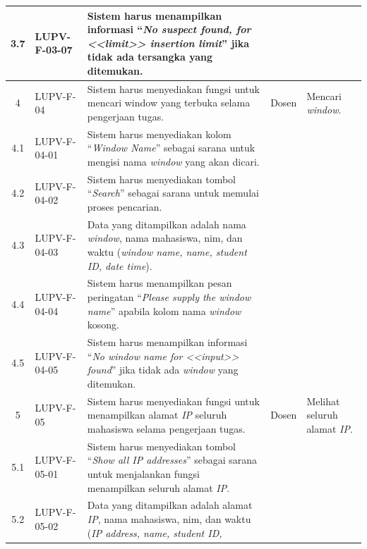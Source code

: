 {\begin{longtable}{|c|L{2.5cm}|L{5cm}|L{1.8cm}|L{2.1cm}|}
    3.7 & LUPV-F-03-07 & Sistem harus menampilkan informasi ``\emph{No
                         suspect found, for <<limit>> insertion limit}'' jika tidak ada tersangka
                         yang ditemukan. & &\\\hline
    4 & LUPV-F-04 & Sistem harus menyediakan fungsi untuk mencari
                    window yang terbuka selama pengerjaan
                    tugas. & Dosen & Mencari \emph{window}. \\
    4.1 & LUPV-F-04-01 & Sistem harus menyediakan kolom ``\emph{Window
                         Name}'' sebagai sarana untuk mengisi nama
                         \emph{window} yang akan dicari.  &  &\\
    4.2 & LUPV-F-04-02 & Sistem harus menyediakan tombol
                         ``\emph{Search}'' sebagai sarana untuk
                         memulai proses pencarian. & &\\
    4.3 & LUPV-F-04-03 & Data yang ditampilkan adalah nama
                         \emph{window}, nama mahasiswa, nim, dan waktu
                         (\emph{window name, name,  student ID,
                         date time}). & &\\
    4.4 & LUPV-F-04-04 & Sistem harus menampilkan pesan peringatan ``\emph{Please supply the window name}''
                         apabila kolom nama \emph{window}
                         kosong. & &\\
    4.5 & LUPV-F-04-05 & Sistem harus menampilkan informasi ``\emph{No
                         window name for <<input>> found}'' jika tidak ada \emph{window}
                         yang ditemukan. & &\\\hline
    5 & LUPV-F-05 & Sistem harus menyediakan fungsi untuk menampilkan
                    alamat \emph{IP} seluruh mahasiswa selama
                    pengerjaan tugas. & Dosen & Melihat seluruh
                                                alamat \emph{IP}. \\
    5.1 & LUPV-F-05-01 & Sistem harus menyediakan tombol
                         ``\emph{Show all IP addresses}'' sebagai sarana untuk
                         menjalankan fungsi menampilkan seluruh alamat
                         \emph{IP}. & &\\
    5.2 & LUPV-F-05-02 & Data yang ditampilkan adalah
                         alamat \emph{IP}, nama mahasiswa, nim, dan waktu
                         (\emph{IP address, name,  student ID,
}
\end{longtable}}
